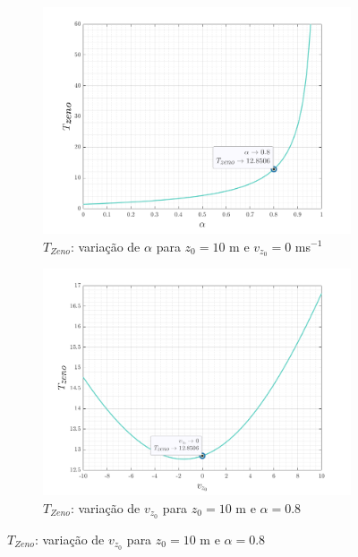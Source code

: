 \vspace{-0.75em}
\begin{figure}[H] 
    \begin{subfigure}[b]{0.33\linewidth}
        \centering
        \includegraphics[width=1\linewidth]{img/P1/P1-coefTimpacto.png}
        \caption{$T_{Zeno}$: variação de $\alpha$ para $z_0 = 10$ m e $v_{z_0} = 0$ ms$^{-1}$} 
        \label{fig:coefTimpacto} 
    \end{subfigure}%
    \begin{subfigure}[b]{0.33\linewidth}
        \centering
        \includegraphics[width=1\linewidth]{img/P1/P1-veloTinf.png} 
        \caption{$T_{Zeno}$: variação de $v_{z_0}$ para $z_0 = 10$ m e $\alpha = 0.8$} 

\end{subfigure}
\end{figure}
